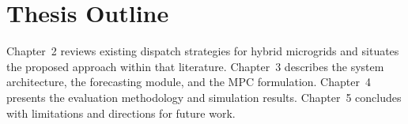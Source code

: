 \section{Thesis Outline}
Chapter~2 reviews existing dispatch strategies for hybrid microgrids and situates the proposed
approach within that literature. Chapter~3 describes the system architecture, the forecasting
module, and the MPC formulation. Chapter~4 presents the evaluation methodology and simulation
results. Chapter~5 concludes with limitations and directions for future work.

